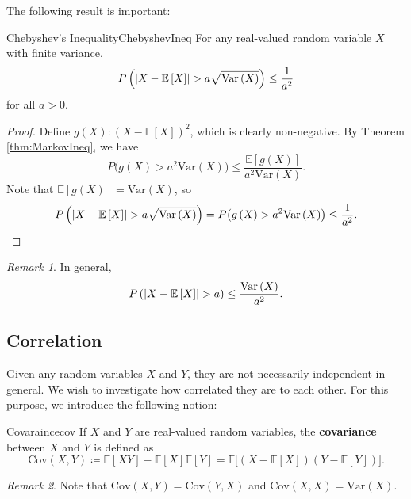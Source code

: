 \documentclass[math, code]{amznotes}
\theoremstyle{remark}
\newtheorem*{remark}{Remark}
\begin{document}
The following result is important:
\begin{thmbox}{Chebyshev's Inequality}{ChebyshevIneq}
    For any real-valued random variable $X$ with finite variance, 
    \begin{equation*}
        P\left({\left\lvert {X - \mathbb{E}\left[X\right]} \right\rvert} > a\sqrt{\mathrm{Var}\left(X\right)}\right) \leq \frac{1}{a^2}
    \end{equation*}
    for all $a > 0$.
    \tcblower
    \begin{proof}
        Define $g\left(X\right) \colon \left(X - \mathbb{E}\left[X\right]\right)^2$, which is clearly non-negative. By Theorem \ref{thm:MarkovIneq}, we have 
        \begin{equation*}
            P\bigl(g\left(X\right) > a^2\mathrm{Var}\left(X\right)\bigr) \leq \frac{\mathbb{E}\left[g\left(X\right)\right]}{a^2\mathrm{Var}\left(X\right)}.
        \end{equation*}
        Note that $\mathbb{E}\left[g\left(X\right)\right] = \mathrm{Var}\left(X\right)$, so 
        \begin{equation*}
            P\left({\left\lvert {X - \mathbb{E}\left[X\right]} \right\rvert} > a\sqrt{\mathrm{Var}\left(X\right)}\right) = P\bigl(g\left(X\right) > a^2\mathrm{Var}\left(X\right)\bigr) \leq \frac{1}{a^2}.
        \end{equation*}
    \end{proof}
\end{thmbox}
\begin{notebox}
    \begin{remark}
        In general, 
        \begin{equation*}
            P\left({\left\lvert {X - \mathbb{E}\left[X\right]} \right\rvert} > a\right) \leq \frac{\mathrm{Var}\left(X\right)}{a^2}.
        \end{equation*}
    \end{remark}
\end{notebox}
\subsection{Correlation}
Given any random variables $X$ and $Y$, they are not necessarily independent in general. We wish to investigate how correlated they are to each other. For this purpose, we introduce the following notion:
\begin{dfnbox}{Covaraince}{cov}
    If $X$ and $Y$ are real-valued random variables, the {\color{red} \textbf{covariance}} between $X$ and $Y$ is defined as
    \begin{equation*}
        \mathrm{Cov}\left(X, Y\right) \coloneqq \mathbb{E}\left[XY\right] - \mathbb{E}\left[X\right]\mathbb{E}\left[Y\right] = \mathbb{E}\bigl[\left(X - \mathbb{E}\left[X\right]\right)\left(Y - \mathbb{E}\left[Y\right]\right)\bigr].
    \end{equation*}
\end{dfnbox}
\begin{notebox}
    \begin{remark}
        Note that $\mathrm{Cov}\left(X, Y\right) = \mathrm{Cov}\left(Y, X\right)$ and $\mathrm{Cov}\left(X, X\right) = \mathrm{Var}\left(X\right)$.
    \end{remark}
\end{notebox}
\end{document}
